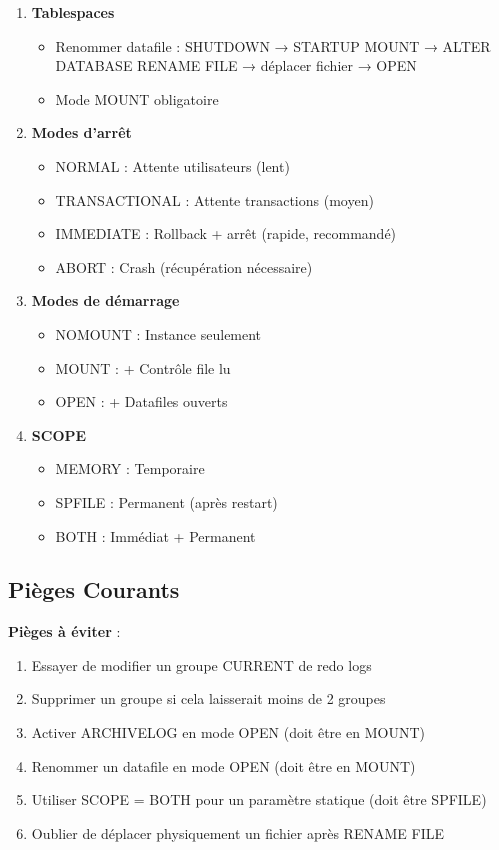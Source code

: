 \documentclass[11pt,a4paper]{article}
\begin{document}
\begin{enumerate}
    \item \textbf{Tablespaces}
    \begin{itemize}
        \item Renommer datafile : SHUTDOWN → STARTUP MOUNT → ALTER DATABASE RENAME FILE → déplacer fichier → OPEN
        \item Mode MOUNT obligatoire
    \end{itemize}
    
    \item \textbf{Modes d'arrêt}
    \begin{itemize}
        \item NORMAL : Attente utilisateurs (lent)
        \item TRANSACTIONAL : Attente transactions (moyen)
        \item IMMEDIATE : Rollback + arrêt (rapide, recommandé)
        \item ABORT : Crash (récupération nécessaire)
    \end{itemize}
    
    \item \textbf{Modes de démarrage}
    \begin{itemize}
        \item NOMOUNT : Instance seulement
        \item MOUNT : + Contrôle file lu
        \item OPEN : + Datafiles ouverts
    \end{itemize}
    
    \item \textbf{SCOPE}
    \begin{itemize}
        \item MEMORY : Temporaire
        \item SPFILE : Permanent (après restart)
        \item BOTH : Immédiat + Permanent
    \end{itemize}
\end{enumerate}

\subsection{Pièges Courants}

\begin{dangerbox}
\textbf{Pièges à éviter} :
\begin{enumerate}
    \item Essayer de modifier un groupe CURRENT de redo logs
    \item Supprimer un groupe si cela laisserait moins de 2 groupes
    \item Activer ARCHIVELOG en mode OPEN (doit être en MOUNT)
    \item Renommer un datafile en mode OPEN (doit être en MOUNT)
    \item Utiliser SCOPE = BOTH pour un paramètre statique (doit être SPFILE)
    \item Oublier de déplacer physiquement un fichier après RENAME FILE
\end{enumerate}
\end{dangerbox}
\end{document}
